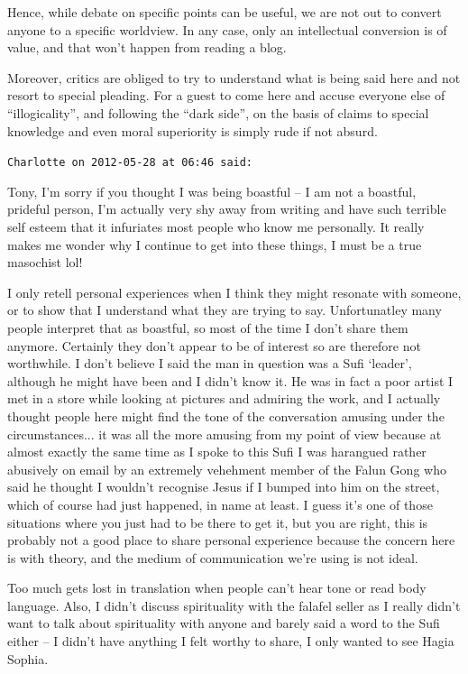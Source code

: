 \begin{footnotesize}
\begin{sffamily}
Hence, while debate on specific points can be useful, we are not out to convert anyone to a specific worldview. In any case, only an intellectual conversion is of value, and that won't happen from reading a blog.

Moreover, critics are obliged to try to understand what is being said here and not resort to special pleading. For a guest to come here and accuse everyone else of ``illogicality'', and following the ``dark side'', on the basis of claims to special knowledge and even moral superiority is simply rude if not absurd.

\hfill

\texttt{Charlotte on 2012-05-28 at 06:46 said:}

Tony, I'm sorry if you thought I was being boastful -- I am not a boastful, prideful person, I'm actually very shy away from writing and have such terrible self esteem that it infuriates most people who know me personally. It really makes me wonder why I continue to get into these things, I must be a true masochist lol!

I only retell personal experiences when I think they might resonate with someone, or to show that I understand what they are trying to say. Unfortunatley many people interpret that as boastful, so most of the time I don't share them anymore. Certainly they don't appear to be of interest so are therefore not worthwhile. I don't believe I said the man in question was a Sufi `leader', although he might have been and I didn't know it. He was in fact a poor artist I met in a store while looking at pictures and admiring the work, and I actually thought people here might find the tone of the conversation amusing under the circumstances... it was all the more amusing from my point of view because at almost exactly the same time as I spoke to this Sufi I was harangued rather abusively on email by an extremely vehehment member of the Falun Gong who said he thought I wouldn't recognise Jesus if I bumped into him on the street, which of course had just happened, in name at least. I guess it's one of those situations where you just had to be there to get it, but you are right, this is probably not a good place to share personal experience because the concern here is with theory, and the medium of communication we're using is not ideal.

Too much gets lost in translation when people can't hear tone or read body language. Also, I didn't discuss spirituality with the falafel seller as I really didn't want to talk about spirituality with anyone and barely said a word to the Sufi either -- I didn't have anything I felt worthy to share, I only wanted to see Hagia Sophia.


\end{sffamily}
\end{footnotesize}
